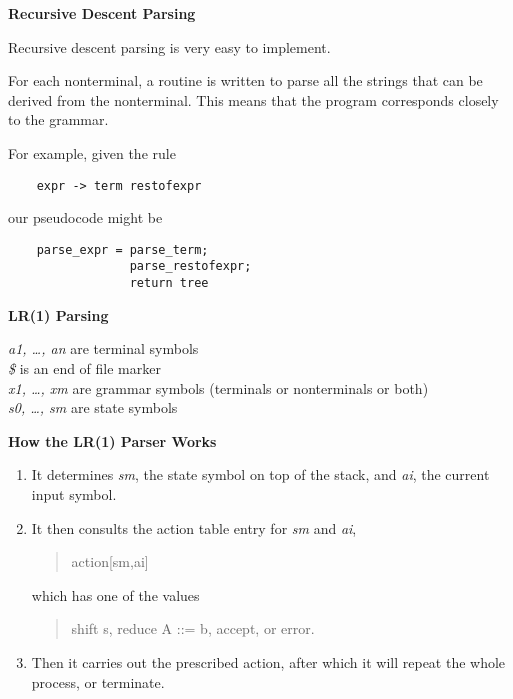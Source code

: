 %
%
\begin{slide}{}
{\bf Recursive Descent Parsing}

Recursive descent parsing is very easy to implement.

For each nonterminal, a routine is written to parse all the
strings that can be derived from the nonterminal.  This means
that the program corresponds closely to the grammar.

For example, given the rule
\begin{verbatim}
    expr -> term restofexpr
\end{verbatim}
our pseudocode might be
\begin{verbatim}
    parse_expr = parse_term;
                 parse_restofexpr;
                 return tree
\end{verbatim}
\end{slide}
%
%
\begin{slide}{}
{\bf LR(1) Parsing}

\vspace{3ex}

{\em a1, \ldots, an} are terminal symbols\\
{\em \$}  is an end of file marker\\
{\em x1, \ldots, xm} are grammar symbols (terminals or nonterminals or both)\\
{\em s0, \ldots, sm} are state symbols
\end{slide}
%
%
\begin{slide}{}
{\bf How the LR(1) Parser Works}
\begin{enumerate}
\item It determines {\em sm}, the state symbol on top of the stack,
      and {\em ai}, the current input symbol.
\item It then consults the action table entry for {\em sm} and {\em ai},
        \begin{quote}
            action[sm,ai]
        \end{quote}
      which has one of the values
        \begin{quote}
           shift s,
           reduce A ::= b,
           accept, or
           error.
        \end{quote}
\item Then it carries out the prescribed action, after which it
      will repeat the whole process, or terminate.
\end{enumerate}
\end{slide}
